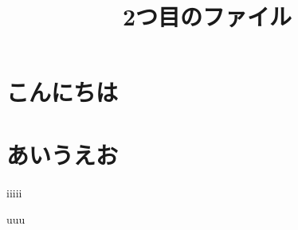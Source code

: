 \documentclass[a4j,epsf,twocolumn]{jarticle}
\title{2つ目のファイル}
\begin{document}
    \section{こんにちは}

    \section{あいうえお}
        iiiii

    \begin{thebibliography}{99}
         uuu
    \end{thebibliography}
\end{document}
